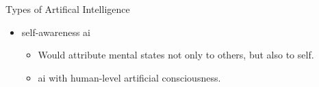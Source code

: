 \begin{frame}{Types of Artifical Intelligence}
\begin{itemize}
        \item 
        \Gls{self-awareness ai}
        \begin{itemize}
            \item Would attribute mental states not only to others, but also to self.
            \item \gls{ai} with human-level artificial consciousness.
        \end{itemize}

    \end{itemize}
    
\end{frame}
